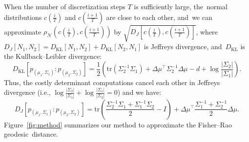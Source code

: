 \documentclass[entropy,article,accept,oneauthor,pdftex,entropy]{Definitions/mdpi}
\def\KL{\mathrm{KL}}
\def\tr{\mathrm{tr}}
\def\calN{\mathcal{N}}
\begin{document}
When the number of discretization steps $T$ is sufficiently large, the~normal distributions 
$c\left(\frac{i}{T}\right)$ and $c\left(\frac{i+1}{T}\right)$ are close to each other, and~we can approximate 
$\rho_\calN\left(c\left(\frac{i}{T}\right),c\left(\frac{i+1}{T}\right)\right)$ 
by $\sqrt{D_J\left[c\left(\frac{i}{T}\right),c\left(\frac{i+1}{T}\right)\right]}$, where $D_J[N_1,N_2]=D_\KL[N_1,N_2]+D_\KL[N_2,N_1]$ is Jeffreys divergence, and~$D_\KL$ is the Kullback–Leibler divergence:
$$
D_\KL[p_{(\mu_1,\Sigma_1)}:p_{(\mu_2,\Sigma_2)}]
=\frac{1}{2}\left(
\tr(\Sigma_2^{-1}\Sigma_1)+\Delta\mu^\top\Sigma_2^{-1}\Delta\mu-d+\log\frac{|\Sigma_2|}{|\Sigma_1|}
\right).
$$
Thus, the costly determinant computations cancel each other in Jeffreys divergence (i.e., $\log\frac{|\Sigma_2|}{|\Sigma_1|}+\log\frac{|\Sigma_1|}{|\Sigma_2|}=0$) and we have:
$$
D_J[p_{(\mu_1,\Sigma_1)}:p_{(\mu_2,\Sigma_2)}]=\tr\left(\frac{\Sigma_2^{-1}\Sigma_1+\Sigma_1^{-1}\Sigma_2}{2}-I\right)
+\Delta\mu^\top\frac{\Sigma_1^{-1}+\Sigma_2^{-1}}{2}\Delta\mu.
$$
Figure~\ref{fig:method} summarizes our method to approximate the Fisher–Rao geodesic~distance.
\end{document}

